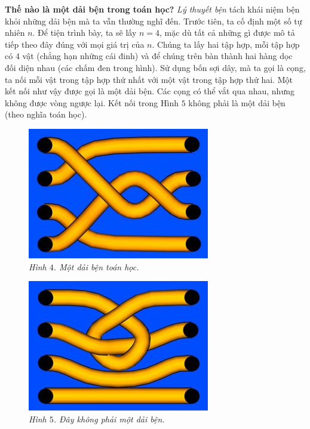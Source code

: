 \begin{multicols}{2}
	\vskip 0.1cm
	\textbf{\color{duongvaotoanhoc}Thế nào là một dải bện trong toán học?}
	\vskip 0.1cm
	\textit{Lý thuyết bện} tách khái niệm bện khỏi những dải bện mà ta vẫn thường nghĩ đến. Trước tiên, ta cố định một số tự nhiên $n$. Để tiện trình bày, ta sẽ lấy $n = 4$, mặc dù tất cả những gì được mô tả tiếp theo đây đúng với mọi giá trị của $n$. Chúng ta lấy hai tập hợp, mỗi tập hợp có $4$ vật (chẳng hạn những cái đinh) và để chúng trên bàn thành hai hàng dọc đối diện nhau (các chấm đen trong hình). Sử dụng bốn sợi dây, mà ta gọi là cọng, ta nối mỗi vật trong tập hợp thứ nhất với một vật trong tập hợp thứ hai. Một kết nối như vậy được gọi là một dải bện. Các cọng có thể vắt qua nhau, nhưng không được vòng ngược lại. Kết nối trong Hình $5$ không phải là một dải bện (theo nghĩa toán học).
	\begin{figure}[H]
		\vspace*{-5pt}
		\centering
		\captionsetup{labelformat= empty, justification=centering}
		\includegraphics[width= 0.48\linewidth]{fig_04}
		\caption{\small\textit{\color{duongvaotoanhoc}Hình $4$. Một dải bện toán học.}}
		\vspace*{-10pt}
	\end{figure}
	\begin{figure}[H]
		\vspace*{-10pt}
		\centering
		\captionsetup{labelformat= empty, justification=centering}
		\includegraphics[width= 0.48\linewidth]{fig_05}
		\caption{\small\textit{\color{duongvaotoanhoc}Hình $5$. Đây không phải một dải bện.}}
		\vspace*{-10pt}
	\end{figure}	

\end{multicols}
